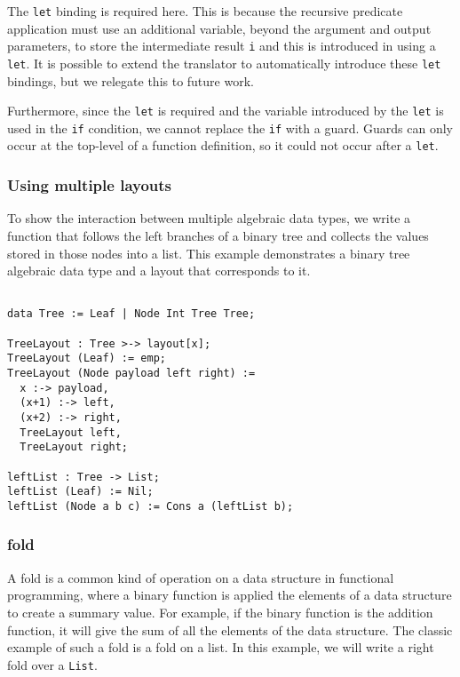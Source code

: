 \noindent
The \verb|let| binding is required here. This is because the recursive predicate
application must use an additional variable, beyond the argument and output
parameters, to store the intermediate result \verb|i| and this is introduced in
\Pika{} using a \verb|let|. It is possible to extend the translator to
automatically introduce these \verb|let| bindings, but we relegate this to future work.

Furthermore, since the \verb|let| is required and the variable introduced by the \verb|let| is used
in the \verb|if| condition, we cannot replace the \verb|if| with a guard. Guards can only occur
at the top-level of a function definition, so it could not occur after a \verb|let|.

\subsubsection{Using multiple layouts}

To show the interaction between multiple algebraic data types, we write a
function that follows the left branches of a binary tree and collects the values
stored in those nodes into a list. This example demonstrates a binary tree
algebraic data type and a layout that corresponds to it.

\begin{lstlisting}[language=Pika]
%generate leftList [TreeLayout] Sll

data Tree := Leaf | Node Int Tree Tree;

TreeLayout : Tree >-> layout[x];
TreeLayout (Leaf) := emp;
TreeLayout (Node payload left right) :=
  x :-> payload,
  (x+1) :-> left,
  (x+2) :-> right,
  TreeLayout left,
  TreeLayout right;

leftList : Tree -> List;
leftList (Leaf) := Nil;
leftList (Node a b c) := Cons a (leftList b);
\end{lstlisting}


\subsubsection{fold}
\label{sec:examples-fold}

A fold is a common kind of operation on a data structure in functional programming, where a binary function
is applied the elements of a data structure to create a summary value. For example, if the binary function
is the addition function, it will give the sum of all the elements of the data structure. The
classic example of such a fold is a fold on a list. In this example, we will write a
right fold over a \verb|List|.

